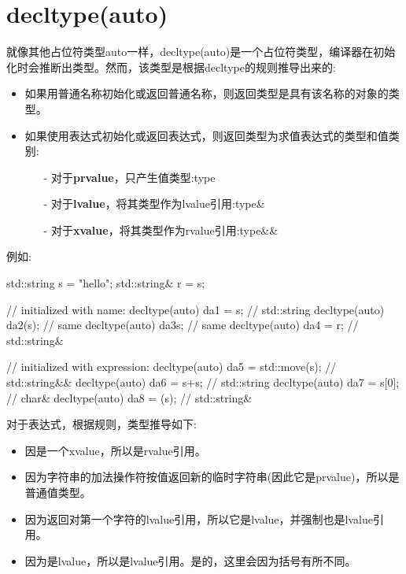 \section{decltype(auto)}
就像其他占位符类型auto一样，decltype(auto)是一个占位符类型，编译器在初始化时会推断出类型。然而，该类型是根据decltype的规则推导出来的:

\begin{itemize}
	\item 如果用普通名称初始化或返回普通名称，则返回类型是具有该名称的对象的类型。
	\item 如果使用表达式初始化或返回表达式，则返回类型为求值表达式的类型和值类别:
	\begin{itemize}
		\item[-] 对于\textbf{prvalue}，只产生值类型:type
		\item[-] 对于\textbf{lvalue}，将其类型作为lvalue引用:type\&
		\item[-] 对于\textbf{xvalue}，将其类型作为rvalue引用:type\&\&
	\end{itemize}
\end{itemize}

例如:

\begin{cppcode}
std::string s = "hello";
std::string& r = s;

// initialized with name:
decltype(auto) da1 = s; // std::string
decltype(auto) da2(s); // same
decltype(auto) da3{s}; // same
decltype(auto) da4 = r; // std::string&

// initialized with expression:
decltype(auto) da5 = std::move(s); // std::string&&
decltype(auto) da6 = s+s; // std::string
decltype(auto) da7 = s[0]; // char&
decltype(auto) da8 = (s); // std::string&
\end{cppcode}

对于表达式，根据规则，类型推导如下:

\begin{itemize}
	\item 因是一个xvalue，所以是rvalue引用。
	\item 因为字符串的加法操作符按值返回新的临时字符串(因此它是prvalue)，所以是普通值类型。
	\item 因为返回对第一个字符的lvalue引用，所以它是lvalue，并强制也是lvalue引用。
	\item 因为是lvalue，所以是lvalue引用。是的，这里会因为括号有所不同。
\end{itemize}

